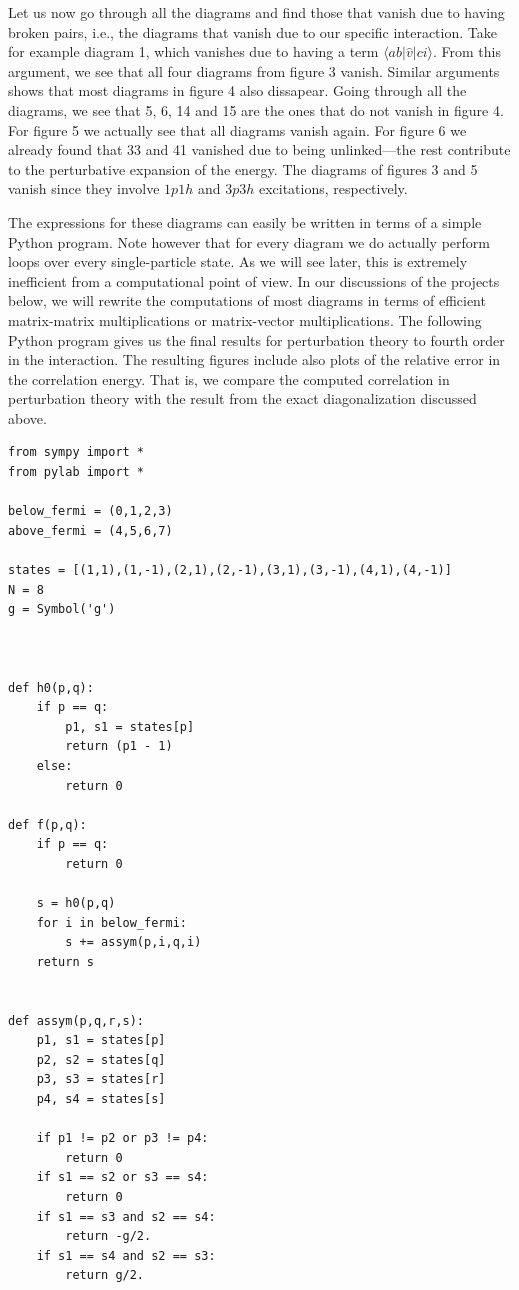 \begin{prob}
Let us now go through all the diagrams and find those that vanish due
to having broken pairs, i.e., the diagrams that vanish due to our
specific interaction. Take for example diagram 1, which vanishes due
to having a term $\langle ab\vert \hat{v} \vert ci\rangle$. From this
argument, we see that all four diagrams from figure 3 vanish. Similar
arguments shows that most diagrams in figure 4 also dissapear. Going
through all the diagrams, we see that 5, 6, 14 and 15 are the ones
that do not vanish in figure 4. For figure 5 we actually see that all
diagrams vanish again. For figure 6 we already found that 33 and 41
vanished due to being unlinked---the rest contribute to the perturbative expansion of the
energy.
The diagrams of figures 3 and 5 vanish since they involve $1p1h$ and $3p3h$ excitations, respectively.

The expressions for these diagrams can easily be written in terms of a
simple Python program. Note however that for every diagram we do
actually perform loops over every single-particle state. As we will
see later, this is extremely inefficient from a computational point
of view. In our discussions of the projects below, we will rewrite the
computations of most diagrams in terms of efficient matrix-matrix
multiplications or matrix-vector multiplications.  The following
Python program gives us the final results for perturbation theory to fourth
order in the interaction. The resulting figures include also plots of the relative error in the
correlation energy. That is, we compare the computed correlation in
perturbation theory with the result from the exact diagonalization discussed above.

\begin{lstlisting}
from sympy import *
from pylab import *

below_fermi = (0,1,2,3)
above_fermi = (4,5,6,7)

states = [(1,1),(1,-1),(2,1),(2,-1),(3,1),(3,-1),(4,1),(4,-1)]
N = 8
g = Symbol('g')



def h0(p,q):
	if p == q:
		p1, s1 = states[p]
		return (p1 - 1)
	else:
		return 0

def f(p,q):
	if p == q:
		return 0

	s = h0(p,q)
	for i in below_fermi:
		s += assym(p,i,q,i)
	return s


def assym(p,q,r,s):
	p1, s1 = states[p]
	p2, s2 = states[q]
	p3, s3 = states[r]
	p4, s4 = states[s]

	if p1 != p2 or p3 != p4:
		return 0
	if s1 == s2 or s3 == s4:
		return 0
	if s1 == s3 and s2 == s4:
		return -g/2.
	if s1 == s4 and s2 == s3:
		return g/2.


\end{lstlisting}
\end{prob}

